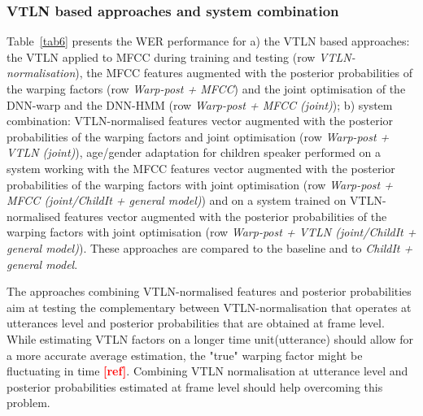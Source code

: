 \documentclass{nle}
\begin{document}
\subsubsection{VTLN based approaches and system combination}
Table~\ref{tab6} presents the WER performance for a) the VTLN based approaches: the VTLN applied to MFCC during training and testing (row {\em VTLN-normalisation}), the MFCC features augmented with the posterior probabilities of the warping factors (row {\em Warp-post + MFCC}) and the joint optimisation of the DNN-warp and the DNN-HMM (row {\em Warp-post + MFCC (joint)}); b) system combination: VTLN-normalised features vector augmented with the posterior probabilities of the warping factors and joint optimisation (row {\em Warp-post + VTLN (joint)}), age/gender adaptation for children speaker performed on a system working with the MFCC features vector augmented with the posterior probabilities of the warping factors with joint optimisation (row {\em Warp-post + MFCC (joint/ChildIt + general model)}) and on a system trained on VTLN-normalised features vector augmented with the posterior probabilities of the warping factors with joint optimisation (row {\em Warp-post + VTLN (joint/ChildIt + general model)}). These approaches are compared to the baseline and to {\em ChildIt + general model}. 

The approaches combining VTLN-normalised features and posterior probabilities aim at testing the complementary between VTLN-normalisation that operates at utterances level and posterior probabilities that are obtained at frame level. While estimating VTLN factors on a longer time unit(utterance) should allow for a more accurate average estimation, the "true" warping factor might be fluctuating in time \textbf{\textcolor{red}{[ref]}}. Combining VTLN normalisation at utterance level and posterior probabilities estimated at frame level should help overcoming this problem.
\end{document}
